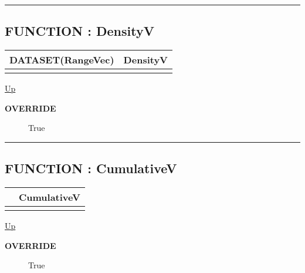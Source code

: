 \rule{\textwidth}{0.4pt}

\subsection*{FUNCTION : DensityV}
\hypertarget{ecldoc:linearregression.ols.distributionbase.densityv}{}

{\renewcommand{\arraystretch}{1.5}
\begin{tabularx}{\textwidth}{|>{\raggedright\arraybackslash}l|X|}
\hline
\hspace{0pt}DATASET(RangeVec) & DensityV \\
\hline
\multicolumn{2}{|>{\raggedright\arraybackslash}X|}{\hspace{0pt}()} \\
\hline
\end{tabularx}
}

\hyperlink{ecldoc:linearregression.ols.fdistribution}{Up}

\par

\par
\begin{description}
\item [\textbf{OVERRIDE}] True
\end{description}

\rule{\textwidth}{0.4pt}
\subsection*{FUNCTION : CumulativeV}
\hypertarget{ecldoc:linearregression.ols.distributionbase.cumulativev}{}

{\renewcommand{\arraystretch}{1.5}
\begin{tabularx}{\textwidth}{|>{\raggedright\arraybackslash}l|X|}
\hline
\hspace{0pt} & CumulativeV \\
\hline
\multicolumn{2}{|>{\raggedright\arraybackslash}X|}{\hspace{0pt}()} \\
\hline
\end{tabularx}
}

\hyperlink{ecldoc:linearregression.ols.fdistribution}{Up}

\par

\par
\begin{description}
\item [\textbf{OVERRIDE}] True
\end{description}

